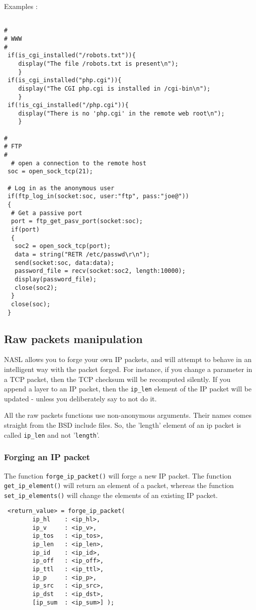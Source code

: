 \documentclass{article}
\begin{document}
\noindent Examples :
\begin{verbatim}

#
# WWW
#
 if(is_cgi_installed("/robots.txt")){
 	display("The file /robots.txt is present\n");
	}
 if(is_cgi_installed("php.cgi")){
 	display("The CGI php.cgi is installed in /cgi-bin\n");
	}
 if(!is_cgi_installed("/php.cgi")){
 	display("There is no 'php.cgi' in the remote web root\n");
	}

#
# FTP
#
  # open a connection to the remote host
 soc = open_sock_tcp(21);
 
 # Log in as the anonymous user
 if(ftp_log_in(socket:soc, user:"ftp", pass:"joe@"))
 {
  # Get a passive port
  port = ftp_get_pasv_port(socket:soc);
  if(port)
  {
   soc2 = open_sock_tcp(port);
   data = string("RETR /etc/passwd\r\n");
   send(socket:soc, data:data);
   password_file = recv(socket:soc2, length:10000);
   display(password_file);
   close(soc2);
  }
  close(soc);
 }

\end{verbatim}   

\subsection{Raw packets manipulation}

NASL allows you to forge your own IP packets, and will attempt
to behave in an intelligent way with the packet forged. For instance,
if you change a parameter in a TCP packet, then the TCP checksum will
be recomputed silently. If you append a layer to an IP packet, then
the \verb+ip_len+ element of the IP packet will be updated - unless
you deliberately say to not do it.

All the raw packets functions use non-anonymous arguments. Their
names comes straight from the BSD include files. So, the 'length'
element of an ip packet is called \verb+ip_len+ and not
'\verb+length+'.


\subsubsection{Forging an IP packet}
The function \verb+forge_ip_packet()+ will forge a new IP packet. The function 
\verb+get_ip_element()+ will return an element of a packet, whereas the
function \verb+set_ip_elements()+ will change the elements of an existing IP
packet.

\begin{verbatim}
 <return_value> = forge_ip_packet(
		ip_hl    : <ip_hl>,
		ip_v     : <ip_v>,
		ip_tos   : <ip_tos>,
		ip_len   : <ip_len>,
		ip_id    : <ip_id>,
		ip_off   : <ip_off>,
		ip_ttl   : <ip_ttl>,
		ip_p     : <ip_p>,
		ip_src   : <ip_src>,
		ip_dst   : <ip_dst>,
		[ip_sum  : <ip_sum>] );
	      
\end{verbatim}
\end{document}
